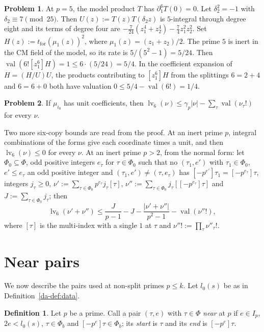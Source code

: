 \documentclass[reqno]{amsart}
\theoremstyle{definition}
\newtheorem{problem}{Problem}[section]
\newtheorem{definition}{Definition}[section]
\theoremstyle{plain}
\newcommand{\val}{\operatorname{val}}
\newcommand{\lv}{\operatorname{lv}}
\begin{document}
\begin{problem}\label{pr:isotropic-five}
At \(p=5\), the model product \(T\) has \(\partial_1^6 T(0)=0\).  Let \(\delta_2^2=-1\) with \(\delta_2\equiv7\pmod{25}\).  Then \(U(z):=T(z)T(\delta_2 z)\) is \(5\)-integral through degree eight and its terms of degree four are \(-\tfrac7{24}(z_1^4+z_2^4)-\tfrac74 z_1^2z_2^2\).  Set \(H(z):=t_{\mathrm{for}}(\mu_1(z))^2\), where \(\mu_1(z)=(z_1+z_2)/2\).  The prime \(5\) is inert in the CM field of the model, so its rate is \(5/(5^2-1)=5/24\).  Then \(\val(6![z_1^6]H)=1\le 6\cdot(5/24)=5/4\).  In the coefficient expansion of \(H=(H/U)U\), the products contributing to \([z_1^6]H\) from the splittings \(6=2+4\) and \(6=6+0\) both have valuation \(0\le 5/4-\val(6!)=1/4\).
\end{problem}

\begin{problem}\label{pr:six-unit}
If \(\mu_{i_0}\) has unit coefficients, then \(\lv_6(\nu) \le \gamma_p\lvert\nu\rvert - \sum_{\tau}\val(\nu_\tau!)\) for every \(\nu\).
\end{problem}

Two more six-copy bounds are read from the proof.  At an inert prime \(p\), integral combinations of the forms give each coordinate times a unit, and then \(\lv_6(\nu) \le 0\) for every \(\nu\).  At an inert prime \(p > 2\), from the normal form: let \(\Phi_0 \subseteq \Phi\), odd positive integers \(e_\tau\) for \(\tau \in \Phi_0\) such that no \((\tau_1, e')\) with \(\tau_1 \in \Phi_0\), \(e' \le e_\tau\) an odd positive integer and \((\tau_1,e') \ne (\tau,e_\tau)\) has \([-p^{e'}]\tau_1 = [-p^{e_\tau}]\tau\), integers \(j_\tau \ge 0\), \(\nu' := \sum_{\tau\in\Phi_0} p^{e_\tau}j_\tau[\tau]\), \(\nu'' := \sum_{\tau\in\Phi_0} j_\tau[[-p^{e_\tau}]\tau]\) and \(J := \sum_{\tau\in\Phi_0} j_\tau\); then
\[
  \lv_6(\nu' + \nu'') \le \frac{J}{p-1} - J - \frac{\lvert\nu' + \nu''\rvert}{p^2-1} - \val(\nu''!) ,
\]
where \([\tau]\) is the multi-index with a single \(1\) at \(\tau\) and \(\nu''! := \prod_\tau \nu''_\tau!\).

\section{Near pairs}\label{sec:near}

We now describe the pairs used at non-split primes \(p \le k\).  Let \(l_0(s)\) be as in Definition~\ref{da-def:data}.

\begin{definition}\label{def:near}
Let \(p\) be a prime.  Call a pair \((\tau, e)\) with \(\tau \in \Phi\) \emph{near} at \(p\) if \(e \in I_p\), \(2e < l_0(s)\), \(\tau \in \Phi_b\) and \([-p^e]\tau \in \Phi_b\); its \emph{start} is \(\tau\) and its \emph{end} is \([-p^e]\tau\).
\end{definition}
\end{document}
